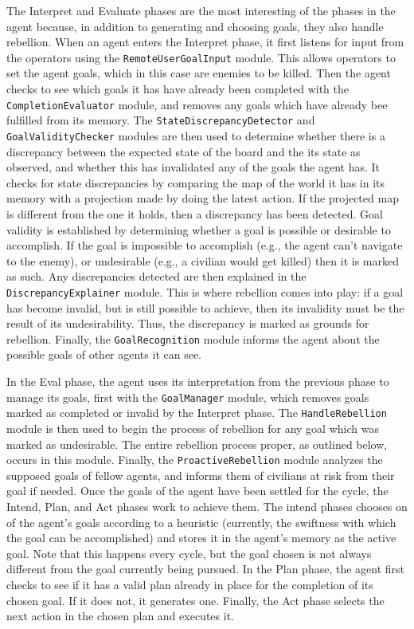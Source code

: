 \documentclass[letterpaper,11pt]{article}
\newcommand{\code}[1]{\texttt{#1}}
\begin{document}
	The Interpret and Evaluate phases are the most interesting of the phases in the agent because, in addition to generating and choosing goals, they also handle rebellion. When an agent enters the Interpret phase, it first listens for input from the operators using the \code{RemoteUserGoalInput} module. This allows operators to set the agent goals, which in this case are enemies to be killed. Then the agent checks to see which goals it has have already been completed with the \code{CompletionEvaluator} module, and removes any goals which have already bee fulfilled from its memory. The \code{StateDiscrepancyDetector} and \code{GoalValidityChecker} modules are then used to determine whether there is a discrepancy between the expected state of the board and the its state as observed, and whether this has invalidated any of the goals the agent has. It checks for state discrepancies by comparing the map of the world it has in its memory with a projection made by doing the latest action. If the projected map is different from the one it holds, then a discrepancy has been detected. Goal validity is established by determining whether a goal is possible or desirable to accomplish. If the goal is impossible to accomplish (e.g., the agent can't navigate to the enemy), or undesirable (e.g., a civilian would get killed) then it is marked as such. Any discrepancies detected are then explained in the \code{DiscrepancyExplainer} module. This is where rebellion comes into play: if a goal has become invalid, but is still possible to achieve, then its invalidity must be the result of its undesirability. Thus, the discrepancy is marked as grounds for rebellion. Finally, the \code{GoalRecognition} module informs the agent about the possible goals of other agents it can see. \par
	
	In the Eval phase, the agent uses its interpretation from the previous phase to manage its goals, first with the \code{GoalManager} module, which removes goals marked as completed or invalid by the Interpret phase. The \code{HandleRebellion} module is then used to begin the process of rebellion for any goal which was marked as undesirable. The entire rebellion process proper, as outlined below, occurs in this module. Finally, the \code{ProactiveRebellion} module analyzes the supposed goals of fellow agents, and informs them of civilians at risk from their goal if needed. Once the goals of the agent have been settled for the cycle, the Intend, Plan, and Act phases work to achieve them. The intend phases chooses on of the agent's goals according to a heuristic (currently, the swiftness with which the goal can be accomplished) and stores it in the agent's memory as the active goal. Note that this happens every cycle, but the goal chosen is not always different from the goal currently being pursued. In the Plan phase, the agent first checks to see if it has a valid plan already in place for the completion of its chosen goal. If it does not, it generates one. Finally, the Act phase selects the next action in the chosen plan and executes it. \par
	
\end{document}
